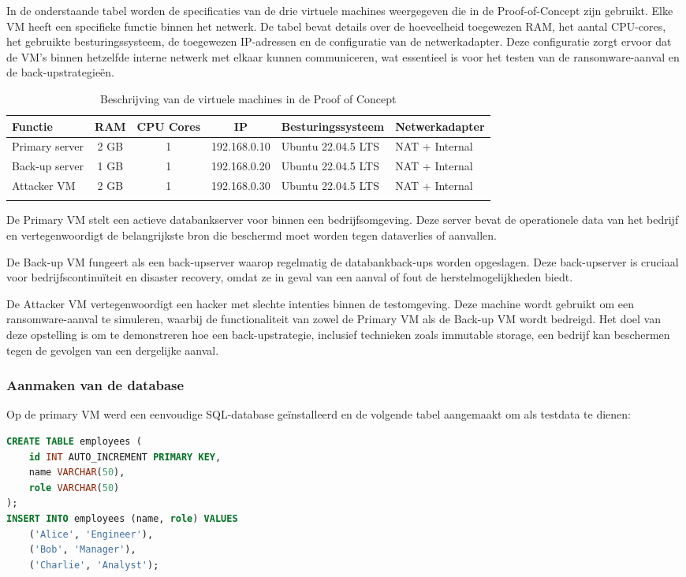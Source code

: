 In de onderstaande tabel worden de specificaties van de drie virtuele machines weergegeven die in de Proof-of-Concept zijn gebruikt. Elke VM heeft een specifieke functie binnen het netwerk. De tabel bevat details over de hoeveelheid toegewezen RAM, het aantal CPU-cores, het gebruikte besturingssysteem, de toegewezen IP-adressen en de configuratie van de netwerkadapter. Deze configuratie zorgt ervoor dat de VM's binnen hetzelfde interne netwerk met elkaar kunnen communiceren, wat essentieel is voor het testen van de ransomware-aanval en de back-upstrategieën.
\begin{longtable}{|l|c|c|c|l|l|}
    \hline
    \textbf{Functie} & \textbf{RAM} & \textbf{CPU Cores} & \textbf{IP} & \textbf{Besturingssysteem} & \textbf{Netwerkadapter} \\ \hline
    Primary server    & 2 GB         & 1                  & 192.168.0.10 & Ubuntu 22.04.5 LTS & NAT + Internal \\ \hline
    Back-up server           & 1 GB         & 1                  & 192.168.0.20 & Ubuntu 22.04.5 LTS & NAT + Internal \\ \hline
    Attacker VM         & 2 GB         & 1                  & 192.168.0.30 & Ubuntu 22.04.5 LTS     & NAT + Internal \\ \hline
    
\caption{Beschrijving van de virtuele machines in de Proof of Concept}
\end{longtable}

De Primary VM stelt een actieve databankserver voor binnen een bedrijfsomgeving. Deze server bevat de operationele data van het bedrijf en vertegenwoordigt de belangrijkste bron die beschermd moet worden tegen dataverlies of aanvallen. 

De Back-up VM fungeert als een back-upserver waarop regelmatig de databankback-ups worden opgeslagen. Deze back-upserver is cruciaal voor bedrijfscontinuïteit en disaster recovery, omdat ze in geval van een aanval of fout de herstelmogelijkheden biedt. 

De Attacker VM vertegenwoordigt een hacker met slechte intenties binnen de testomgeving. Deze machine wordt gebruikt om een ransomware-aanval te simuleren, waarbij de functionaliteit van zowel de Primary VM als de Back-up VM wordt bedreigd. Het doel van deze opstelling is om te demonstreren hoe een back-upstrategie, inclusief technieken zoals immutable storage, een bedrijf kan beschermen tegen de gevolgen van een dergelijke aanval.
\subsubsection{Aanmaken van de database}
Op de primary VM werd een eenvoudige SQL-database geïnstalleerd en de volgende tabel aangemaakt om als testdata te dienen:
\begin{lstlisting}[language=SQL, caption={MySQL-code voor het aanmaken van de testdatabank}]
CREATE TABLE employees (
    id INT AUTO_INCREMENT PRIMARY KEY,
    name VARCHAR(50),
    role VARCHAR(50)
);
INSERT INTO employees (name, role) VALUES 
    ('Alice', 'Engineer'), 
    ('Bob', 'Manager'), 
    ('Charlie', 'Analyst');
\end{lstlisting}



